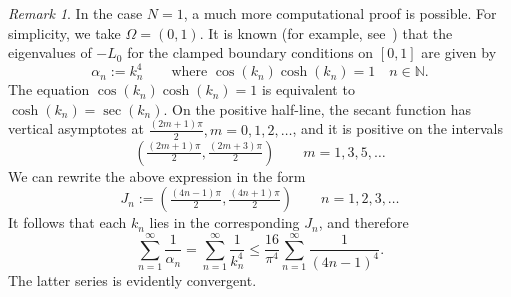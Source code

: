 \documentclass[a4paper, reqno,titlepage]{amsart}
\numberwithin{equation}{section}
\theoremstyle{plain}
\theoremstyle{definition}
\theoremstyle{remark}
\newtheorem{remark}[theorem]{Remark}
\newcommand{\NN}{\mathbb{N}}
\begin{document}
\begin{remark}
  In the case $N=1$, a much more computational proof is possible. For simplicity, we take $\Omega = (0,1)$. It is known (for example, see~\cite[p.\,296]{CH}) that the eigenvalues of $-L_0$ for the clamped boundary conditions on $[0, 1]$ are given by
  \begin{equation}
    \alpha_n := k_n^4 \qquad \text{where } \cos(k_n)\cosh(k_n) = 1 \quad n \in \NN.
  \end{equation}
  The equation $\cos (k_n) \cosh (k_n) = 1$ is equivalent to $\cosh(k_n) = \sec(k_n)$. On the positive half-line, the secant function has vertical asymptotes at $\tfrac{(2m+1)\pi}{2}, m = 0, 1, 2, \ldots$, and it is positive on the intervals
  \begin{equation*}
    \left(\tfrac{(2m+1)\pi}{2}, \tfrac{(2m+3)\pi}{2} \right) \qquad m = 1, 3, 5, \ldots
  \end{equation*}
  We can rewrite the above expression in the form
  \begin{equation*}
    J_n := \left(\tfrac{(4n-1)\pi}{2}, \tfrac{(4n+1)\pi}{2} \right) \qquad n=1,2,3, \ldots
  \end{equation*}
  It follows that each $k_n$ lies in the corresponding $J_n$, and therefore
  \begin{equation*}
    \sum_{n=1}^\infty \frac{1}{\alpha_n} = \sum_{n=1}^\infty \frac{1}{k_n^4} \leq \frac{16}{\pi^4} \sum_{n=1}^\infty \frac{1}{(4n-1)^4}.
  \end{equation*}
  The latter series is evidently convergent.
\end{remark}
\end{document}
